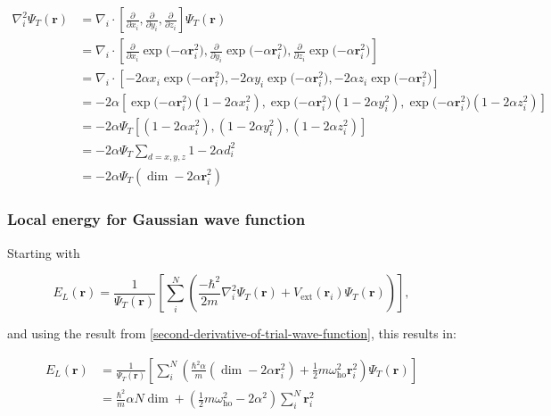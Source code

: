 \documentclass[
]{article}
\begin{document}
\[
\begin{aligned}
\nabla_{i}^2 \Psi_{T}(\mathbf{r})
&= \nabla_{i} \cdot\left[\frac{\partial}{\partial x_{i}}, \frac{\partial}{\partial y_{i}},   
   \frac{\partial}{\partial z_{i}}\right] \Psi_{T}(\mathbf{r}) \\
&= \nabla_i \cdot \left[\frac{\partial}{\partial x_i} \exp{(-\alpha
   \mathbf{r}_i^2}),\frac{\partial}{\partial y_i} \exp{(-\alpha \mathbf{r}_i^2}), \frac{\partial}{\partial z_i} \exp{(-\alpha \mathbf{r}_i^2})\right] \\
&= \nabla_{i} \cdot \left[-2 \alpha x_{i} \exp{(-\alpha \mathbf{r}_{i}^{2}}), -2 \alpha
   y_{i}  
   \exp{(-\alpha \mathbf{r}^2_{i}}), -2 \alpha z_{i} \exp{(-\alpha \mathbf{r}_{i}^2})
   \right] \\
&= -2 \alpha \left[  \exp{(-\alpha \mathbf{r}^2_{i}})(1 - 2 \alpha x^2_{i}), \exp{(-\alpha
   \mathbf{r}^2_{i}})(1 - 2 \alpha y^2_{i}), \exp{(-\alpha \mathbf{r}^2_{i}})
   (1 - 2 \alpha z^2_{i}) \right] \\
&= -2\alpha \Psi_{T} \left[(1 - 2 \alpha x^2_{i}), (1 - 2 \alpha y^2_{i}),
   (1 - 2 \alpha  z^2_{i}) \right]\\
&= -2\alpha \Psi_{T}\sum_{d = x,y,z}1 -2\alpha d_{i}^2 \\
&= -2\alpha \Psi_{T}(\dim - 2 \alpha  \mathbf{r}^2_{i})
\end{aligned}
\]

\hypertarget{local-energy-for-gaussian-wave-function}{%
\subsubsection{Local energy for Gaussian wave
function}\label{local-energy-for-gaussian-wave-function}}

Starting with

\[
E_L(\mathbf{r}) =
    \frac{1}{\Psi_T(\mathbf{r})} \left[ \sum_i^N \left (\frac{-\hbar^2}{2m}
    \nabla_{i}^2 \Psi_T (\mathbf{r}) + V_\text{ext} ({\mathbf{r}}_i) \Psi_T(\mathbf{r}) \right)  
    \right],
\]

and using the result from
\ref{second-derivative-of-trial-wave-function}, this results in:

\[
\begin{aligned} E_L (\mathbf r) &=  \frac{1}{\Psi_T(\mathbf{r})}  \left[ \sum_i^N \left(  \frac{\hbar^2 \alpha}{m}  (\dim - 2
    \alpha  \mathbf{r}^2_{i} ) + \frac{1}{2} m \omega^2_\text{ho} \mathbf{r}^2_{i} \right) \Psi_T(\mathbf{r}) \right ]\\
&= \frac{\hbar^2 }{m} \alpha N \dim +  \left( \frac{1}{2} m \omega^2_\text{ho} - 2 \alpha^2\right)  \sum_i^N \mathbf{r}^2_{i}
\end{aligned}
\]
\end{document}
